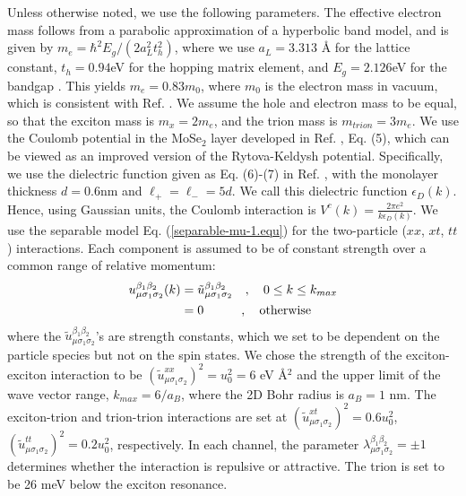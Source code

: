 \documentclass[aps,prb,superscriptaddress,letterpaper,amsmath,amssymb,twocolumn,preprintnumbers]{revtex4}
\begin{document}
Unless otherwise noted, we use the following parameters. The effective electron mass follows from a parabolic approximation of a hyperbolic band model, and is given by
$m_e = \hbar^2  E_g / (2 a_L^2 t_h^2)$, where we use
$a_L = 3.313$ {\AA} for the lattice constant,
 $t_h=0.94$eV for the hopping matrix element,
and $E_g = 2.126$eV for the bandgap
\cite{xiao-etal.12,yu-etal.14}. This yields
$m_e = 0.83 m_0$, where $m_0$ is the electron mass in vacuum, which is consistent with Ref. . We assume the hole and electron mass to be equal, so that the exciton mass is $m_x = 2 m_e$, and the trion mass is $m_{trion} = 3 m_e$.
%
We use the Coulomb potential in the MoSe$_2$ layer developed in Ref. , Eq. (5), which can be viewed as an improved version of the Rytova-Keldysh potential. Specifically, we use the dielectric function given as Eq. (6)-(7) in Ref. , with the monolayer thickness $d=0.6$nm and
$\ell_+ = \ell_- = 5 d$. We call this dielectric function $\epsilon_D(k)$.
Hence, using Gaussian units, the Coulomb interaction is
$V^c(k) = \frac{2 \pi e^2}{ k \epsilon_D(k) } $.
%
%
We use the separable model Eq. (\ref{separable-mu-1.equ}) for the two-particle ($xx$, $xt$, $tt$) interactions. Each component is assumed to be of constant strength over a common range of relative momentum:
\begin{align}\label{separable-mu-u-1.equ}
u^{\beta_1 \beta_2}_{\mu \sigma_1 \sigma_2}(k) &= \tilde{u}^{\beta_1 \beta_2}_{\mu \sigma_1 \sigma_2} \quad , \quad 0 \leq k \leq k_{max} \\
&= 0 \quad \quad \quad , \quad {\rm otherwise} \nonumber
\end{align}
where the $\tilde{u}^{\beta_1 \beta_2}_{\mu \sigma_1 \sigma_2}$'s are strength constants, which we set to be dependent on the particle species but not on the spin states.
%
We chose the strength of the exciton-exciton interaction to be
$\left( \tilde{u}^{xx}_{\mu \sigma_1 \sigma_2} \right)^2 = u_0^2 = 6$ eV {\AA}$^2$ and the upper limit of the wave vector range, $k_{max} = 6 / a_B$, where the 2D  Bohr radius is $a_B = 1$ nm.
The exciton-trion and trion-trion interactions are set at
$\left( \tilde{u}^{xt}_{\mu \sigma_1 \sigma_2} \right)^2 =   0.6 u_0^2$,
$\left( \tilde{u}^{tt}_{\mu \sigma_1 \sigma_2} \right)^2 = 0.2 u_0^2$, respectively.
In each channel, the parameter $\lambda^{\beta_1 \beta_2}_{\mu \sigma_1 \sigma_2} = \pm 1$ determines whether the interaction is repulsive or attractive.
The trion is set to be 26 meV below the exciton resonance.
\end{document}
